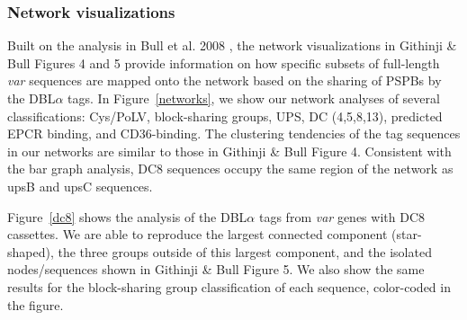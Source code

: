 \documentclass[10pt,twocolumn,superscriptaddress]{revtex4-1}
\newcommand{\var}{{\it var}\xspace}
\newcommand{\dbla}{{DBL$\alpha$}\xspace}
\newcommand{\cidra}{{CIDR$\alpha$}\xspace}
\newcommand{\cp}{{Cys/PoLV}\xspace}
\newcommand{\paper}{{Githinji \& Bull}\xspace}
\newcommand{\figdir}{figures/}
\begin{document}
\subsubsection{Network visualizations}
Built on the analysis in Bull et al. 2008 \cite{bull2008}, the network visualizations in \paper Figures 4 and 5 provide information on how specific subsets of full-length \var sequences are mapped onto the network based on the sharing of PSPBs by the \dbla tags. In Figure~\ref{networks}, we show our network analyses of several classifications: \cp, block-sharing groups, UPS, DC (4,5,8,13), predicted EPCR binding, and CD36-binding. The clustering tendencies of the tag sequences in our networks are similar to those in \paper Figure 4. Consistent with the bar graph analysis, DC8 sequences occupy the same region of the network as upsB and upsC sequences.  

%

Figure~\ref{dc8} shows the analysis of the \dbla tags from \var genes with DC8 cassettes. We are able to reproduce the largest connected component (star-shaped), the three groups outside of this largest component, and the isolated nodes/sequences shown in \paper Figure 5. We also show the same results for the block-sharing group classification of each sequence, color-coded in the figure.
\end{document}
